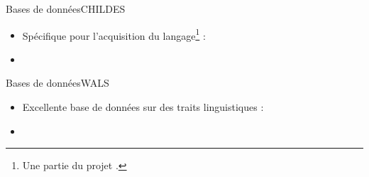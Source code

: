 \documentclass[xcolor=dvipsnames, onlymath, 10pt, aspectratio=169, handout]{beamer}
\begin{document}


\begin{frame}{Bases de données}{CHILDES}

	\begin{itemize}
		\item[] Spécifique pour l'acquisition du langage\footnote{Une partie du projet .} : 
		\item[]
	\end{itemize}

	\begin{center}
	\end{center}


\end{frame}




\begin{frame}{Bases de données}{WALS}

	\begin{itemize}
		\item[] Excellente base de données sur des traits linguistiques : 
		\item[]
	\end{itemize}

	\begin{center}
	\end{center}


\end{frame}
\end{document}
